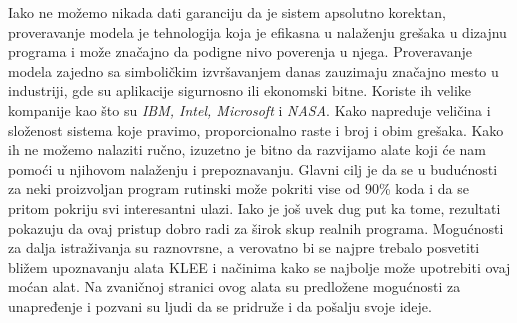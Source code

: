 \documentclass[a4paper]{article}
\begin{document}
Iako ne možemo nikada dati garanciju da je sistem apsolutno korektan, proveravanje modela je tehnologija koja je efikasna u nalaženju grešaka u dizajnu programa i može značajno da podigne nivo poverenja u njega.
Proveravanje modela zajedno sa simboličkim izvršavanjem danas zauzimaju značajno mesto u industriji, gde su aplikacije sigurnosno ili ekonomski bitne. Koriste ih velike kompanije kao što su \textit{IBM, Intel, Microsoft} i \textit{NASA}. Kako napreduje veličina i složenost sistema koje pravimo, proporcionalno raste i broj i obim grešaka. Kako ih ne možemo nalaziti ručno, izuzetno je bitno da razvijamo alate koji će nam pomoći u njihovom nalaženju i prepoznavanju. Glavni cilj je da se u budućnosti za neki proizvoljan program rutinski može pokriti vise od 90\% koda i da se pritom pokriju svi interesantni ulazi. Iako je još uvek dug put ka tome, rezultati pokazuju da ovaj pristup dobro radi za širok skup realnih programa. Mogućnosti za dalja istraživanja su raznovrsne, a verovatno bi se najpre trebalo posvetiti bližem upoznavanju alata KLEE i načinima kako se najbolje može upotrebiti ovaj moćan alat. Na zvaničnoj stranici ovog alata su predložene mogućnosti za unapređenje i pozvani su ljudi da se pridruže i da pošalju svoje ideje.


\appendix
 

\end{document}
